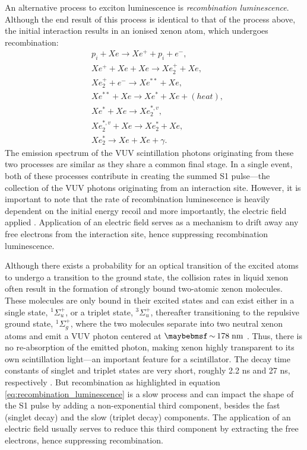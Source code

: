 An alternative process to exciton luminescence is \textit{recombination luminescence}. Although the end result of this process is identical to that of the process above, the initial interaction results in an ionised xenon atom, which undergoes recombination:
%
\begin{align} \label{eq:recombination_luminescence}
    &p_{i} + Xe \rightarrow Xe^{+} + p_{i} + e^{-}, \\
    &Xe^{+} + Xe + Xe \rightarrow Xe^{+}_{2} + Xe, \\
    &Xe^{+}_{2} + e^{-} \rightarrow Xe^{\ast\ast} + Xe, \\
    &Xe^{\ast\ast} + Xe \rightarrow Xe^{\ast} + Xe + (heat), \\
    &Xe^{\ast} + Xe \rightarrow Xe^{\ast, v}_{2}, \\
    &Xe^{\ast, v}_{2} + Xe \rightarrow Xe^{\ast}_{2} + Xe, \\
    &Xe^{\ast}_{2} \rightarrow  Xe +  Xe + \gamma.
\end{align}
%
The emission spectrum of the VUV scintillation photons originating from these two processes are similar as they share a common final stage. In a single event, both of these processes contribute in creating the summed S1 pulse---the collection of the VUV photons originating from an interaction site. However, it is important to note that the rate of recombination luminescence is heavily dependent on the initial energy recoil and more importantly, the electric field applied \cite{Dahl}. Application of an electric field serves as a mechanism to drift away any free electrons from the interaction site, hence suppressing recombination luminescence. 

Although there exists a probability for an optical transition of the excited atoms to undergo a transition to the ground state, the collision rates in liquid xenon often result in the formation of strongly bound two-atomic xenon molecules. These molecules are only bound in their excited states and can exist either in a single state, $^{1}\Sigma^{+}_{u}$, or a triplet state, $^{3}\Sigma^{+}_{u}$, thereafter transitioning to the repulsive ground state, $^{1}\Sigma^{+}_{g}$, where the two molecules separate into two neutral xenon atoms and emit a VUV photon centered at $\sim 178 \; \MathText{nm}$ \cite{FUJII2015293}. Thus, there is no re-absorption of the emitted photon, making xenon highly transparent to its own scintillation light---an important feature for a scintillator. The decay time constants of singlet and triplet states are very short, roughly 2.2 ns and 27 ns, respectively \cite{xenon_physics}. But recombination as highlighted in equation \ref{eq:recombination_luminescence} is a slow process and can impact the shape of the S1 pulse by adding a non-exponential third component, besides the fast (singlet decay) and the slow (triplet decay) components. The application of an electric field usually serves to reduce this third component by extracting the free electrons, hence suppressing recombination.

